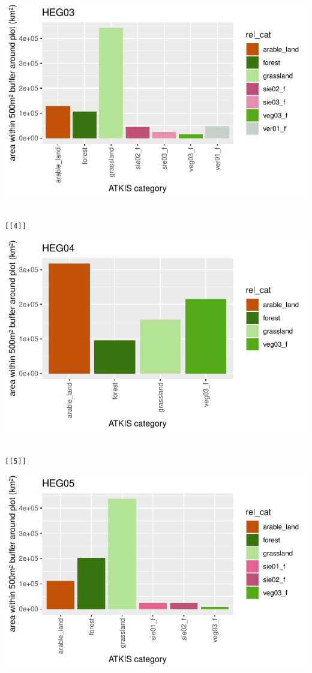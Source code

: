 \documentclass[
  letterpaper,
  DIV=11,
  numbers=noendperiod]{scrartcl}
\begin{document}
\includegraphics{Landscape_Indices_files/figure-pdf/unnamed-chunk-15-3.pdf}

\begin{verbatim}

[[4]]
\end{verbatim}

\includegraphics{Landscape_Indices_files/figure-pdf/unnamed-chunk-15-4.pdf}

\begin{verbatim}

[[5]]
\end{verbatim}

\includegraphics{Landscape_Indices_files/figure-pdf/unnamed-chunk-15-5.pdf}
\end{document}
